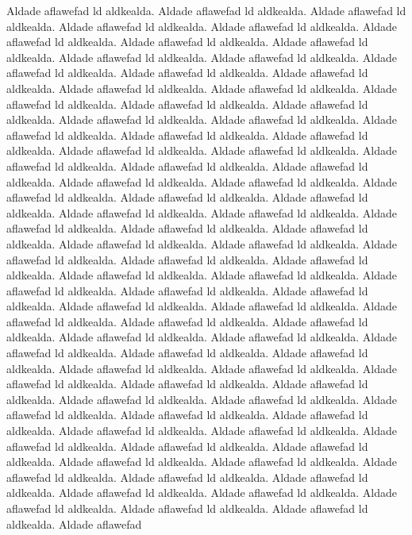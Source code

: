 %


Aldade aflawefad ld aldkealda. Aldade aflawefad ld aldkealda. Aldade aflawefad
ld aldkealda. Aldade aflawefad ld aldkealda. Aldade aflawefad ld aldkealda. Aldade aflawefad
ld aldkealda. Aldade aflawefad ld aldkealda. Aldade aflawefad ld aldkealda. Aldade aflawefad
ld aldkealda. Aldade aflawefad ld aldkealda. Aldade aflawefad ld aldkealda. Aldade aflawefad
ld aldkealda. Aldade aflawefad ld aldkealda. Aldade aflawefad ld aldkealda. Aldade aflawefad
ld aldkealda. Aldade aflawefad ld aldkealda. Aldade aflawefad ld aldkealda. Aldade aflawefad
ld aldkealda. Aldade aflawefad ld aldkealda. Aldade aflawefad ld aldkealda. Aldade aflawefad
ld aldkealda. Aldade aflawefad ld aldkealda. Aldade aflawefad ld aldkealda. Aldade aflawefad
ld aldkealda. Aldade aflawefad ld aldkealda. Aldade aflawefad ld aldkealda. Aldade aflawefad
ld aldkealda. Aldade aflawefad ld aldkealda. Aldade aflawefad ld aldkealda. Aldade aflawefad
ld aldkealda. 
Aldade aflawefad ld aldkealda. Aldade aflawefad ld aldkealda. Aldade aflawefad
ld aldkealda. Aldade aflawefad ld aldkealda. Aldade aflawefad ld aldkealda. Aldade aflawefad
ld aldkealda. Aldade aflawefad ld aldkealda. Aldade aflawefad ld aldkealda. Aldade aflawefad
ld aldkealda. Aldade aflawefad ld aldkealda. Aldade aflawefad ld aldkealda. Aldade aflawefad
ld aldkealda. Aldade aflawefad ld aldkealda. Aldade aflawefad ld aldkealda. Aldade aflawefad
ld aldkealda. Aldade aflawefad ld aldkealda. Aldade aflawefad ld aldkealda. Aldade aflawefad
ld aldkealda. Aldade aflawefad ld aldkealda. Aldade aflawefad ld aldkealda. Aldade aflawefad
ld aldkealda. Aldade aflawefad ld aldkealda. Aldade aflawefad ld aldkealda. Aldade aflawefad
ld aldkealda. Aldade aflawefad ld aldkealda. Aldade aflawefad ld aldkealda. Aldade aflawefad
ld aldkealda. Aldade aflawefad ld aldkealda. Aldade aflawefad ld aldkealda. Aldade aflawefad
ld aldkealda. 
Aldade aflawefad ld aldkealda. Aldade aflawefad ld aldkealda. Aldade aflawefad
ld aldkealda. Aldade aflawefad ld aldkealda. Aldade aflawefad ld aldkealda. Aldade aflawefad
ld aldkealda. Aldade aflawefad ld aldkealda. Aldade aflawefad ld aldkealda. Aldade aflawefad
ld aldkealda. Aldade aflawefad ld aldkealda. Aldade aflawefad ld aldkealda. Aldade aflawefad
ld aldkealda. Aldade aflawefad ld aldkealda. Aldade aflawefad ld aldkealda. Aldade aflawefad
ld aldkealda. Aldade aflawefad ld aldkealda. Aldade aflawefad ld aldkealda. Aldade aflawefad
ld aldkealda. Aldade aflawefad ld aldkealda. Aldade aflawefad ld aldkealda. Aldade aflawefad
ld aldkealda. Aldade aflawefad ld aldkealda. Aldade aflawefad ld aldkealda. Aldade aflawefad
